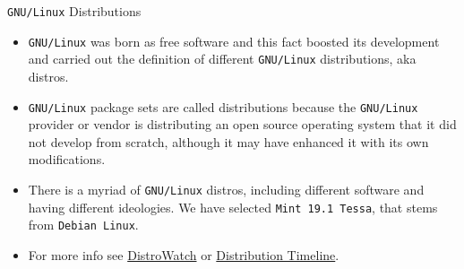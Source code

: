 \begin{frame}{\texttt{GNU/Linux} Distributions}
    \begin{itemize}
  \item {\footnotesize \texttt{GNU/Linux} was born as free software and this fact boosted its development and carried out the definition of different \texttt{GNU/Linux} distributions, aka distros.}

  \item {\footnotesize \texttt{GNU/Linux} package sets are called distributions because the \texttt{GNU/Linux} provider or  vendor is distributing an open source operating system that it did not develop from scratch, although it may have enhanced it with its own modifications.}

  \item {\footnotesize   There is a myriad of \texttt{GNU/Linux} distros, including different software and having different ideologies. We have selected \alert{\texttt{Mint 19.1 Tessa}}, that stems from \texttt{Debian Linux}.}
  \item {\footnotesize  For more info see \href{http://distrowatch.com/}{DistroWatch} or \href{http://futurist.se/gldt/}{Distribution Timeline}.}
  \end{itemize}
\end{frame}
